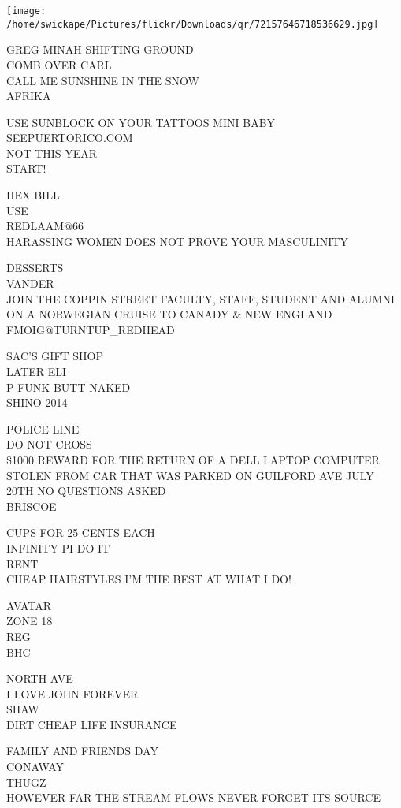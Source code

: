 \documentclass[10pt,letterpaper]{article}
\begin{document}
\texttt{[image: /home/swickape/Pictures/flickr/Downloads/qr/72157646718536629.jpg]}


GREG MINAH SHIFTING GROUND\\
COMB OVER CARL\\
CALL ME SUNSHINE IN THE SNOW\\
AFRIKA

USE SUNBLOCK ON YOUR TATTOOS MINI BABY\\
SEEPUERTORICO.COM\\
NOT THIS YEAR\\
START!

HEX BILL\\
USE\\
REDLAAM@66\\
HARASSING WOMEN DOES NOT PROVE YOUR MASCULINITY

DESSERTS\\
VANDER\\
JOIN THE COPPIN STREET FACULTY, STAFF, STUDENT AND ALUMNI ON A NORWEGIAN CRUISE TO CANADY \& NEW ENGLAND\\
FMOIG@TURNTUP\_REDHEAD

SAC'S GIFT SHOP\\
LATER ELI\\
P FUNK BUTT NAKED\\
SHINO 2014

POLICE LINE\\
DO NOT CROSS\\
\$1000 REWARD FOR THE RETURN OF A DELL LAPTOP COMPUTER STOLEN FROM CAR THAT WAS PARKED ON GUILFORD AVE JULY 20TH NO QUESTIONS ASKED\\
BRISCOE

CUPS FOR 25 CENTS EACH\\
INFINITY PI DO IT\\
RENT\\
CHEAP HAIRSTYLES I'M THE BEST AT WHAT I DO!

AVATAR\\
ZONE 18\\
REG\\
BHC

NORTH AVE\\
I LOVE JOHN FOREVER\\
SHAW\\
DIRT CHEAP LIFE INSURANCE

FAMILY AND FRIENDS DAY\\
CONAWAY\\
THUGZ\\
HOWEVER FAR THE STREAM FLOWS NEVER FORGET ITS SOURCE
\end{document}

